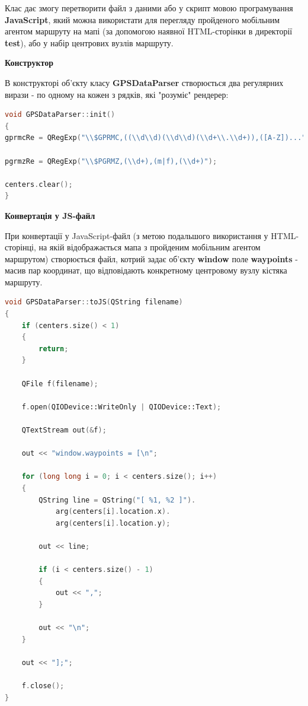\documentclass[simple,a4paper,14pt,ukrainian,utf8]{eskdtext}
\begin{document}
        Клас дає змогу перетворити файл з даними або у скрипт мовою програмування \textbf{JavaScript}, який можна використати для перегляду пройденого мобільним агентом маршруту на мапі (за допомогою наявної HTML-сторінки в директорії \textbf{test}), або у набір центрових вузлів маршруту.
        
        \textbf{Конструктор}
        
        В конструкторі об’єкту класу \textbf{GPSDataParser} створюється два регулярних вирази - по одному на кожен з рядків, які "розуміє" рендерер:
        
\begin{small}
\begin{lstlisting}[language=C++]
void GPSDataParser::init()
{
gprmcRe = QRegExp("\\$GPRMC,((\\d\\d)(\\d\\d)(\\d+\\.\\d+)),([A-Z])...");

pgrmzRe = QRegExp("\\$PGRMZ,(\\d+),(m|f),(\\d+)");

centers.clear();
}
\end{lstlisting}
\end{small}
        
        \textbf{Конвертація у JS-файл}
        
        При конвертації у JavaScript-файл (з метою подальшого використання у HTML-сторінці, на якій відображається мапа з пройденим мобільним агентом маршрутом) створюється файл, котрий задає об’єкту \textbf{window} поле \textbf{waypoints} - масив пар координат, що відповідають конкретному центровому вузлу кістяка маршруту.

\begin{small}        
\begin{lstlisting}[language=C++]
void GPSDataParser::toJS(QString filename)
{
    if (centers.size() < 1)
    {
        return;
    }

    QFile f(filename);

    f.open(QIODevice::WriteOnly | QIODevice::Text);

    QTextStream out(&f);

    out << "window.waypoints = [\n";

    for (long long i = 0; i < centers.size(); i++)
    {
        QString line = QString("[ %1, %2 ]").
        	arg(centers[i].location.x).
        	arg(centers[i].location.y);

        out << line;

        if (i < centers.size() - 1)
        {
            out << ",";
        }

        out << "\n";
    }

    out << "];";

    f.close();
}
\end{lstlisting}
\end{small}
\end{document}
